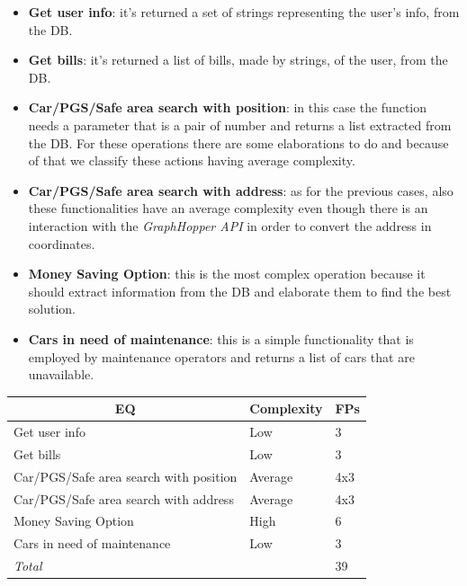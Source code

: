 \documentclass[english]{article}
\begin{document}
\begin{itemize}
	\item{\textbf{Get user info}: it's returned a set of strings representing the user's info, from the DB.}

	\item{\textbf{Get bills}: it's returned a list of bills, made by strings, of the user, from the DB.}

	\item{\textbf{Car/PGS/Safe area search with position}: in this case the function needs a parameter that is a pair of number and returns a list extracted from the DB. For these operations there are some elaborations to do and because of that we classify these actions having average complexity.}

	\item{\textbf{Car/PGS/Safe area search with address}: as for the previous cases, also these functionalities have an average complexity even though there is an interaction with the \textit{GraphHopper API} in order to convert the address in coordinates.}

	\item{\textbf{Money Saving Option}: this is the most complex operation because it should extract information from the DB and elaborate them to find the best solution.}

	\item{\textbf{Cars in need of maintenance}: this is a simple functionality that is employed by maintenance operators and returns a list of cars that are unavailable.}
\end{itemize}


\begin{center}
	\begin{tabular}{ |p{8cm}|m{2cm}|p{1cm}| }
		\hline
		\multicolumn{1}{|c|}{\textbf{EQ}} & \multicolumn{1}{c|}{\textbf{Complexity}} & \multicolumn{1}{c|}{\textbf{FPs}} \\
		\hline
		Get user info & Low & 3 \\
		\hline
		Get bills & Low & 3\\
		\hline
		Car/PGS/Safe area search with position & Average & 4x3\\
		\hline
		Car/PGS/Safe area search with address & Average & 4x3\\
		\hline
		Money Saving Option & High & 6\\
		\hline
		Cars in need of maintenance & Low & 3 \\
		\hline
		\multicolumn{2}{|l|}{\textit{Total}} & \multicolumn{1}{l|}{39}\\
		\hline
	\end{tabular}
\end{center}
\end{document}
